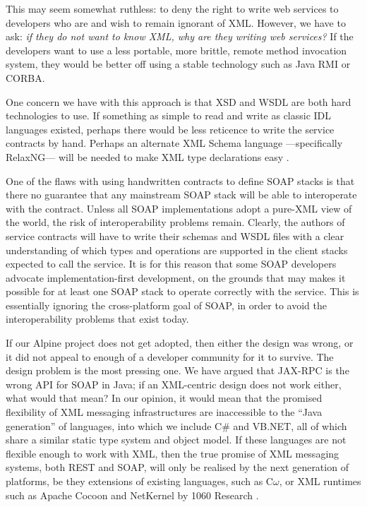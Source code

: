 This may seem somewhat ruthless: to deny the right to write web
services to developers who are and wish to remain ignorant of XML.
However, we have to ask: \emph{if they do not want to know XML, why are
they writing web services?} If the developers want to use a less portable,
more brittle, remote method invocation system, they would be better off
using a stable technology such as Java RMI or CORBA.

One concern we have with this approach is that XSD and WSDL are both hard
technologies to use. If something as simple to read and write as classic IDL
languages existed, perhaps there would be less reticence to write the service
contracts by hand. Perhaps an alternate XML Schema language ---specifically
RelaxNG--- will be needed to make XML type declarations easy
\cite{spec:RelaxNG}. 

One of the flaws with using handwritten contracts to define SOAP stacks is that
there no guarantee that any mainstream SOAP stack will be able to interoperate
with the contract. Unless all SOAP implementations adopt a pure-XML view of the
world, the risk of interoperability problems remain. Clearly, the authors of
service contracts will have to write their schemas and WSDL files with a clear
understanding of which types and operations are supported in the client stacks
expected to call the service. It is for this reason that some SOAP developers
advocate implementation-first development, on the grounds that may makes it
possible for at least one SOAP stack to operate correctly with the service. This
is essentially ignoring the cross-platform goal of SOAP, in order to avoid the
interoperability problems that exist today.

If our Alpine project does not get adopted, then either the design was wrong,
or it did not appeal to enough of a developer community for it to survive. The
design problem is the most pressing one. We have argued that JAX-RPC is the
wrong API for SOAP in Java; if an XML-centric design does not work either, what
would that mean? In our opinion, it would mean that the promised flexibility of
XML messaging infrastructures are inaccessible to the ``Java generation'' of
languages, into which we include C\# and VB.NET, all of which share a similar
static type system and object model. If these languages are not flexible enough
to work with XML, then the true promise of XML messaging systems, both REST and
SOAP, will only be realised by the next generation of platforms, be they
extensions of existing languages, such as C$\omega$, or XML runtimes such as
Apache Cocoon and NetKernel by 1060 Research
\cite{MSFT:TransitionsInProgrammingModels,pjr:NKonTSS}.
